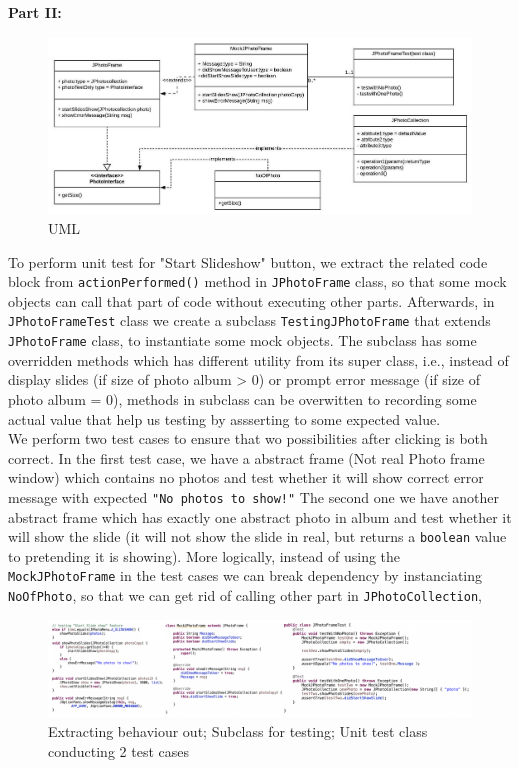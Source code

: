 \documentclass[10pt]{article}
\begin{document}
\pagestyle{empty}
{\bf Part II: } 
\begin{figure}[H]
  \centering
  \setlength{\abovecaptionskip}{-0.1in}
  \setlength{\belowcaptionskip}{-0.15in}
	\includegraphics[width=1\linewidth]{uml}
	\caption{UML}
\end{figure}
To perform unit test for "Start Slideshow" button, we extract the related code block from \texttt{actionPerformed()} method in \texttt{JPhotoFrame} class, 
so that some mock objects can call that part of code without executing other parts. Afterwards, in \texttt{JPhotoFrameTest} class we create a subclass \texttt {TestingJPhotoFrame} that extends \texttt{JPhotoFrame} class, 
to instantiate some mock objects. The subclass has some overridden methods which has different utility from its super class, i.e., instead of display slides (if size of photo album > 0) or prompt error message (if size of photo album = 0),
methods in subclass can be overwitten to recording some actual value that help us testing by assserting to some expected value.\\
We perform two test cases to ensure that wo possibilities after clicking is both correct. In the first test case, we have a abstract frame (Not real Photo frame window) which contains no photos and test whether it will show correct error message with expected \texttt{"No photos to show!"}
The second one we have another abstract frame which has exactly one abstract photo in album and test whether it will show the slide (it will not show the slide in real, but returns a \texttt{boolean} value to pretending it is showing). 
More logically, instead of using the \texttt{MockJPhotoFrame} in the test cases we can break dependency by instanciating \texttt{NoOfPhoto}, so that we can get rid of calling other part in \texttt{JPhotoCollection}, 
\begin{figure}[H]
  \centering
  \setlength{\abovecaptionskip}{-0.1in}
  \setlength{\belowcaptionskip}{-0.15in}
	\includegraphics[width=1\linewidth]{codeblock}
	\caption{Extracting behaviour out; Subclass for testing; Unit test class conducting 2 test cases}
\end{figure}
\end{document}
